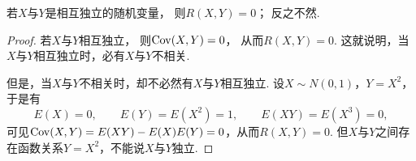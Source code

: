 \begin{theorem}
若\(X\)与\(Y\)是相互独立的随机变量，
则\(R(X,Y)=0\)；
反之不然.
\begin{proof}
若\(X\)与\(Y\)相互独立，
则\(\operatorname{Cov}(X,Y)=0\)，
从而\(R(X,Y)=0\).
这就说明，当\(X\)与\(Y\)相互独立时，必有\(X\)与\(Y\)不相关.

但是，当\(X\)与\(Y\)不相关时，却不必然有\(X\)与\(Y\)相互独立.
设\(X \sim N(0,1)\)，\(Y=X^2\)，
于是有\[
    E(X) = 0,
    \qquad
    E(Y) = E(X^2) = 1,
    \qquad
    E(XY) = E(X^3) = 0,
\]
可见\(\operatorname{Cov}(X,Y) = E(XY) - E(X) E(Y) = 0\)，从而\(R(X,Y) = 0\).
但\(X\)与\(Y\)之间存在函数关系\(Y=X^2\)，不能说\(X\)与\(Y\)独立.
\end{proof}
\end{theorem}
